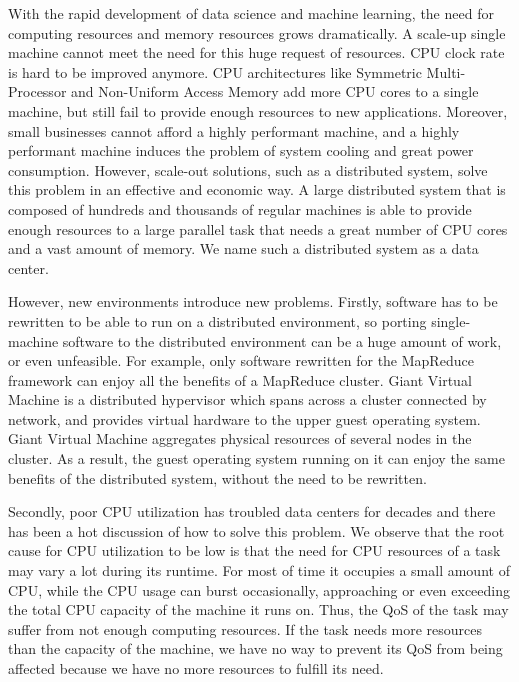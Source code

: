 \begin{bigabstract}

With the rapid development of data science and machine learning, the need for computing resources and memory resources grows dramatically. A scale-up single machine cannot meet the need for this huge request of resources. CPU clock rate is hard to be improved anymore. CPU architectures like Symmetric Multi-Processor and Non-Uniform Access Memory add more CPU cores to a single machine, but still fail to provide enough resources to new applications. Moreover, small businesses cannot afford a highly performant machine, and a highly performant machine induces the problem of system cooling and great power consumption. However, scale-out solutions, such as a distributed system, solve this problem in an effective and economic way. A large distributed system that is composed of hundreds and thousands of regular machines is able to provide enough resources to a large parallel task that needs a great number of CPU cores and a vast amount of memory. We name such a distributed system as a data center.

However, new environments introduce new problems. Firstly, software has to be rewritten to be able to run on a distributed environment, so porting single-machine software to the distributed environment can be a huge amount of work, or even unfeasible. For example, only software rewritten for the MapReduce framework can enjoy all the benefits of a MapReduce cluster. Giant Virtual Machine is a distributed hypervisor which spans across a cluster connected by network, and provides virtual hardware to the upper guest operating system. Giant Virtual Machine aggregates physical resources of several nodes in the cluster. As a result, the guest operating system running on it can enjoy the same benefits of the distributed system, without the need to be rewritten.

Secondly, poor CPU utilization has troubled data centers for decades and there has been a hot discussion of how to solve this problem. We observe that the root cause for CPU utilization to be low is that the need for CPU resources of a task may vary a lot during its runtime. For most of time it occupies a small amount of CPU, while the CPU usage can burst occasionally, approaching or even exceeding the total CPU capacity of the machine it runs on. Thus, the QoS of the task may suffer from not enough computing resources. If the task needs more resources than the capacity of the machine, we have no way to prevent its QoS from being affected because we have no more resources to fulfill its need.


\end{bigabstract}

